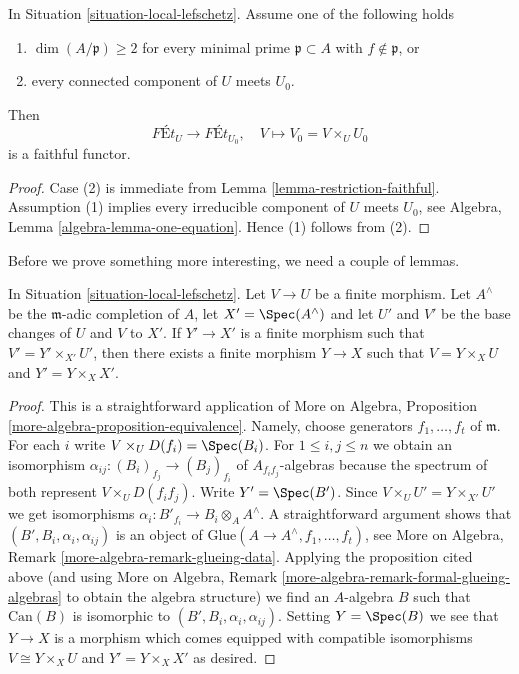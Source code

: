 \begin{lemma}
\label{lemma-faithful}
In Situation \ref{situation-local-lefschetz}.
Assume one of the following holds
\begin{enumerate}
\item $\dim(A/\mathfrak p) \geq 2$ for every minimal prime
$\mathfrak p \subset A$ with $f \not \in \mathfrak p$, or
\item every connected component of $U$ meets $U_0$.
\end{enumerate}
Then
$$
\textit{F\'Et}_U \longrightarrow \textit{F\'Et}_{U_0},\quad
V \longmapsto V_0 = V \times_U U_0
$$
is a faithful functor.
\end{lemma}

\begin{proof}
Case (2) is immediate from Lemma \ref{lemma-restriction-faithful}.
Assumption (1) implies every irreducible component of $U$ meets $U_0$, see
Algebra, Lemma \ref{algebra-lemma-one-equation}.
Hence (1) follows from (2).
\end{proof}

\noindent
Before we prove something more interesting, we need a couple of lemmas.

\begin{lemma}
\label{lemma-fill-in-missing}
In Situation \ref{situation-local-lefschetz}. Let $V \to U$ be a finite
morphism.  Let $A^\wedge$ be the $\mathfrak m$-adic completion of $A$,
let $X' = \Spec(A^\wedge)$ and let $U'$ and $V'$ be the base changes of
$U$ and $V$ to $X'$. If $Y' \to X'$ is a finite morphism such that
$V' = Y' \times_{X'} U'$, then there exists a finite morphism $Y \to X$
such that $V = Y \times_X U$ and $Y' = Y \times_X X'$.
\end{lemma}

\begin{proof}
This is a straightforward application of
More on Algebra, Proposition \ref{more-algebra-proposition-equivalence}.
Namely, choose generators $f_1, \ldots, f_t$ of $\mathfrak m$.
For each $i$ write $V \times_U D(f_i) = \Spec(B_i)$.
For $1 \leq i, j \leq n$ we obtain an isomorphism
$\alpha_{ij} : (B_i)_{f_j} \to (B_j)_{f_i}$ of $A_{f_if_j}$-algebras
because the spectrum of both represent $V \times_U D(f_if_j)$.
Write $Y' = \Spec(B')$. Since $V \times_U U' = Y \times_{X'} U'$
we get isomorphisms $\alpha_i : B'_{f_i} \to B_i \otimes_A A^\wedge$.
A straightforward argument shows that $(B', B_i, \alpha_i, \alpha_{ij})$
is an object of $\text{Glue}(A \to A^\wedge, f_1, \ldots, f_t)$, see
More on Algebra, Remark \ref{more-algebra-remark-glueing-data}.
Applying the proposition cited above (and using
More on Algebra, Remark \ref{more-algebra-remark-formal-glueing-algebras}
to obtain the algebra structure) we find an $A$-algebra $B$ such that
$\text{Can}(B)$ is isomorphic to $(B', B_i, \alpha_i, \alpha_{ij})$.
Setting $Y = \Spec(B)$ we see that $Y \to X$ is a morphism
which comes equipped with compatible isomorphisms
$V \cong Y \times_X U$ and $Y' = Y \times_X X'$ as desired.
\end{proof}

